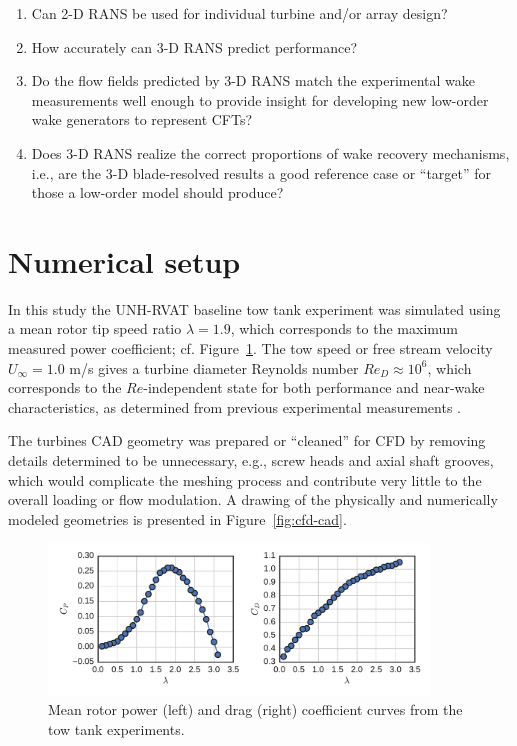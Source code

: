 \documentclass[aip,graphicx]{revtex4-1}
\begin{document}
\begin{enumerate}
    \item Can 2-D RANS be used for individual turbine and/or array design?

    \item How accurately can 3-D RANS predict performance?

    \item Do the flow fields predicted by 3-D RANS match the experimental wake
    measurements well enough to provide insight for developing new low-order
    wake generators to represent CFTs?

    \item Does 3-D RANS realize the correct proportions of wake recovery
    mechanisms, i.e., are the 3-D blade-resolved results a good reference case
    or ``target'' for those a low-order model should produce?
\end{enumerate}


\section{Numerical setup}

In this study the UNH-RVAT baseline tow tank experiment was simulated using a
mean rotor tip speed ratio $\lambda=1.9$, which corresponds to the maximum
measured power coefficient; cf. Figure~\ref{fig:exp-perf}. The tow speed or free
stream velocity $U_\infty=1.0$ m/s gives a turbine diameter Reynolds number
$Re_D \approx 10^6$, which corresponds to the $Re$-independent state for both
performance and near-wake characteristics, as determined from previous
experimental measurements \cite{Bachant2014, Bachant2016-Energies}.

The turbines CAD geometry was prepared or ``cleaned'' for CFD by removing
details determined to be unnecessary, e.g., screw heads and axial shaft grooves,
which would complicate the meshing process and contribute very little to the
overall loading or flow modulation. A drawing of the physically and numerically
modeled geometries is presented in Figure~\ref{fig:cfd-cad}.

\begin{figure}
    \centering

    \includegraphics[width=0.9\textwidth]{figures/exp_perf}

    \caption{Mean rotor power (left) and drag (right) coefficient curves from
        the tow tank experiments\cite{Bachant2016-RVAT-Re-dep}.}

    \label{fig:exp-perf}
\end{figure}
\end{document}
